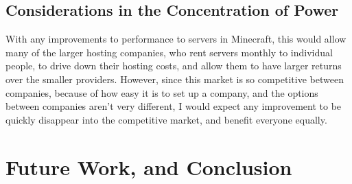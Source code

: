 \documentclass[10pt,twocolumn]{article}
\begin{document}
\subsection{Considerations in the Concentration of Power}

With any improvements to performance to servers in Minecraft, this would allow
many of the larger hosting companies, who rent servers monthly to individual
people, to drive down their hosting costs, and allow them to have larger returns
over the smaller providers. However, since this market is so competitive between
companies, because of how easy it is to set up a company, and the options
between companies aren't very different, I would expect any improvement to be
quickly disappear into the competitive market, and benefit everyone equally.

\section{Future Work, and Conclusion}

\printbibliography
\end{document}
